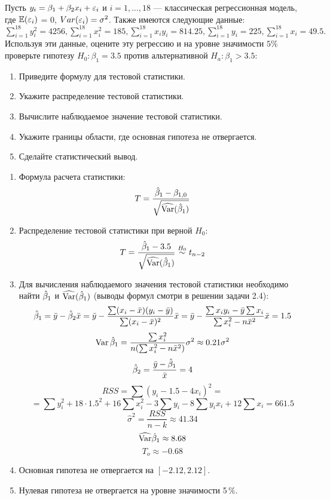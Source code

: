 \begin{problem}
Пусть $y_i = \beta_1 + \beta_2 x_i + \varepsilon_i$ и $i = 1, \dots, 18$ — классическая регрессионная модель, где $\mathbb{E}(\varepsilon_i)$ = 0, $Var(\varepsilon_i) = \sigma^2$. Также имеются следующие данные: $\sum_{i=1}^{18} y_i^2 = 4256, \sum_{i=1}^{18} x_i^2 = 185, \sum_{i=1}^{18} x_iy_i = 814.25, \sum_{i=1}^{18} y_i = 225, \sum_{i=1}^{18} x_i = 49.5.$ Используя эти данные, оцените эту регрессию и на уровне значимости $5\%$ проверьте гипотезу $H_0: \beta_1 = 3.5$ против альтернативной $H_a: \beta_1 > 3.5$:
\begin{enumerate}
\item Приведите формулу для тестовой статистики.
\item Укажите распределение тестовой статистики.
\item Вычислите наблюдаемое значение тестовой статистики.
\item Укажите границы области, где основная гипотеза не отвергается.
\item Сделайте статистический вывод.
\end{enumerate}


\begin{sol}
\begin{enumerate}
\item Формула расчета статистики:
\[T = \frac{\hat{\beta}_1 - \beta_{1,0}}{\sqrt{\widehat{\operatorname{Var}} (\hat{\beta}_1)}}\]
\item Распределение тестовой статистики при верной \(H_0\):
\[T = \frac{\hat{\beta}_1 - 3.5}{\sqrt{\widehat{\operatorname{Var}} (\hat{\beta}_1)}} \overset{H_0}{\sim} t_{n-2} \]
\item Для вычисления наблюдаемого значения тестовой статистики необходимо найти \(\hat{\beta}_1\) и \(\widehat{\operatorname{Var}} (\hat{\beta}_1)\) (выводы формул смотри в решении задачи 2.4):
\[\hat{\beta}_1 = \bar{y} - \hat{\beta}_2 \bar{x} = \bar{y} - \frac{\sum (x_i - \bar{x}) (y_i - \bar{y})}{\sum (x_i - \bar{x})^2} \bar{x} = \bar{y} - \frac{\sum x_i y_i - \bar{y} \sum x_i}{\sum x_i^2 - n \bar{x}^2} \bar{x} = 1.5\]
\[\operatorname{Var} \hat{\beta}_1 = \frac{\sum x_i^2}{n (\sum x_i^2 - n \bar{x}^2)} \sigma^2 \approx 0.21 \sigma^2  \]
\[\hat{\beta}_2 = \frac{\bar{y} - \hat{\beta}_1}{\bar{x}} = 4  \]
\[RSS = \sum (y_i - 1.5 - 4x_i)^2 = \]
\[=\sum y_i^2 + 18 \cdot 1.5^2 + 16 \sum x_i^2 - 3\sum y_i - 8 \sum y_i x_i + 12 \sum x_i = 661.5  \]
\[ \hat{\sigma}^2 = \frac{RSS}{n-k} \approx 41.34 \]
\[\widehat{\operatorname{Var}} \hat{\beta}_1 \approx 8.68\]
\[T_{o} \approx -0.68  \]
\item Основная гипотеза не отвергается на \([-2.12, 2.12]\).
\item Нулевая гипотеза не отвергается на уровне значимости 5\,\%.
\end{enumerate}
\end{sol}
\end{problem}




